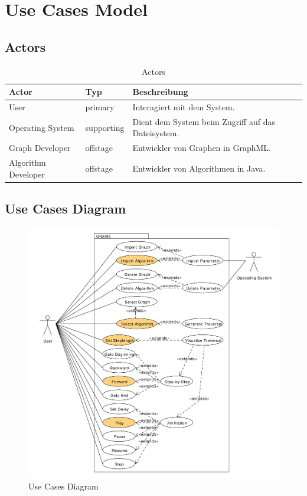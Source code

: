 \section{Use Cases Model}
\label{sec:Use Cases Model}
% 
\subsection{Actors}
\label{subsec:Actors}
\begin{table}[htp]
  \begin{tabular}[t]{|l|l|l|}\hline
	  \rowcolor{tcA}
	  Actor 		& Typ 		& Beschreibung \\\hline
	  User		 	& primary 	& Interagiert mit dem System. \\\hline
	  Operating System 	& supporting 	& Dient dem System beim Zugriff auf das Dateisystem. \\\hline
	  Graph Developer 	& offstage 	& Entwickler von Graphen in GraphML. \\\hline
	  Algorithm Developer 	& offstage 	& Entwickler von Algorithmen in Java. \\\hline
  \end{tabular}
  \caption{Actors}
  \label{tab:actors}
\end{table}
% 
\subsection{Use Cases Diagram}
\label{subsec:Use Cases Diagram}
\begin{figure}[H]
    \centering
    \includegraphics[scale=0.5]{diagrams/use-cases-diagram.pdf}
    \caption{Use Cases Diagram}
    \label{fig:use_cases_diagram}
\end{figure}
% 
